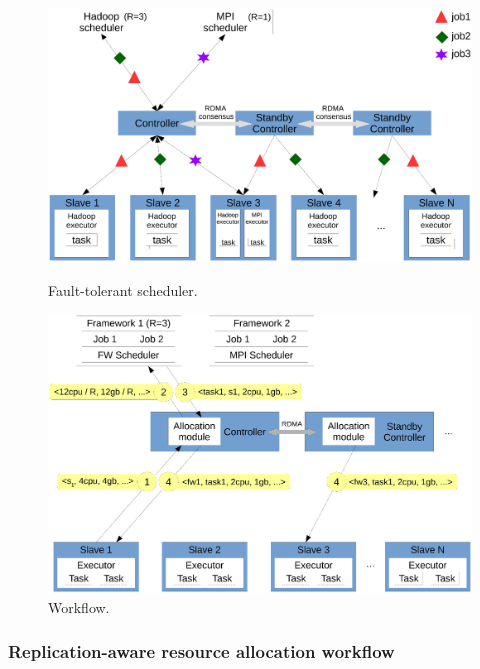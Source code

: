 \begin{figure}[!htb]
    \begin{minipage}{.49\textwidth}
        \vspace{-.2in}
        \includegraphics[width=0.34\textheight]{figures/scheduler_arch.ps}
        \vspace{-.3in}
        \caption{Fault-tolerant scheduler.}
        \label{fig:scheduler-arch}
    \end{minipage}
    \begin{minipage}{0.51\textwidth}
        \vspace{-.2in}
        \includegraphics[width=0.34\textheight]{figures/scheduler_flow.ps}
        \vspace{-.3in}
        \caption{Workflow.}
        \label{fig:scheduler-workflow}
    \end{minipage}
\end{figure}

\vspace{-.15in}\subsubsection{Replication-aware resource allocation workflow}
\label{sec:workflow}\vspace{-.075in}

